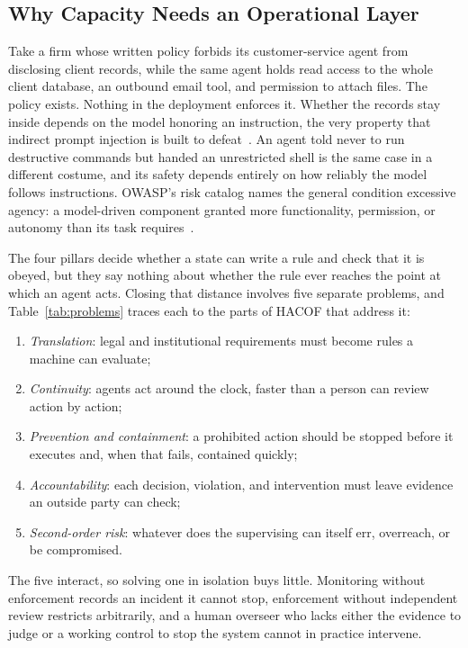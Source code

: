 \documentclass{ieeeaccess}
\newcommand{\hacof}{HACOF}
\begin{document}
\subsection{Why Capacity Needs an Operational Layer}
\label{sec:hacof-a}

Take a firm whose written policy forbids its customer-service agent from disclosing client records, while the same agent holds read access to the whole client database, an outbound email tool, and permission to attach files. The policy exists. Nothing in the deployment enforces it. Whether the records stay inside depends on the model honoring an instruction, the very property that indirect prompt injection is built to defeat~\cite{greshake2023injection}.
An agent told never to run destructive commands but handed an unrestricted shell is the same case in a different costume, and its safety depends entirely on how reliably the model follows instructions. OWASP's risk catalog names the general condition excessive agency: a model-driven component granted more functionality, permission, or autonomy than its task requires~\cite{owasp2025llm}.

The four pillars decide whether a state can write a rule and check that it is obeyed, but they say nothing about whether the rule ever reaches the point at which an agent acts. Closing that distance involves five separate problems, and Table~\ref{tab:problems} traces each to the parts of \hacof{} that address it:
\begin{enumerate}
  \item \textit{Translation}: legal and institutional requirements must become rules a machine can evaluate;
  \item \textit{Continuity}: agents act around the clock, faster than a person can review action by action;
  \item \textit{Prevention and containment}: a prohibited action should be stopped before it executes and, when that fails, contained quickly;
  \item \textit{Accountability}: each decision, violation, and intervention must leave evidence an outside party can check;
  \item \textit{Second-order risk}: whatever does the supervising can itself err, overreach, or be compromised.
\end{enumerate}
The five interact, so solving one in isolation buys little. Monitoring without enforcement records an incident it cannot stop, enforcement without independent review restricts arbitrarily, and a human overseer who lacks either the evidence to judge or a working control to stop the system cannot in practice intervene.
\end{document}
